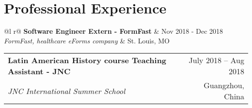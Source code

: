 
\section{Professional Experience}

\begin{tabularx}{\linewidth}{@{}l r@{}}
\textbf{Software Engineer Extern - FormFast}     &    Nov 2018 - Dec 2018 \\
\textit{FormFast, healthcare eForms company} & St. Louis, MO\\
\end{tabularx}


\begin{tabularx}{\linewidth}{@{}l r@{}}
\textbf{Latin American History course Teaching Assistant - JNC}     &   \hspace{25.5mm} July 2018 – Aug 2018 \\[3.75pt]
\textit{JNC International Summer School}  & Guangzhou, China\\
\end{tabularx}
